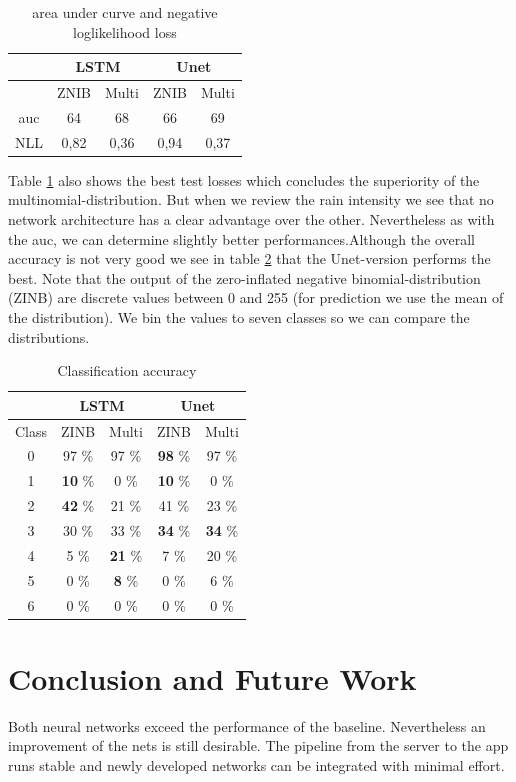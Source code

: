 \documentclass[oneside]{htwg-report}
\begin{document}
\begin{sloppypar}
\begin{table}[h]
\begin{tabular}[h]{|c|cc|cc|}
\hline
&\multicolumn{2}{c}{LSTM} &
\multicolumn{2}{c|}{Unet} \\
\hline
 & ZNIB & Multi & ZNIB & Multi \\
\hline
auc & 64 & 68 & 66 & 69 \\
NLL & 0,82 & 0,36 & 0,94 & 0,37\\
\hline
\end{tabular}

\caption{\centering area under curve and negative loglikelihood loss\label{tab:area}}
\end{table}

 Table \ref{tab:area} also shows the best test losses which concludes the superiority of the multinomial-distribution.
But when we review the rain intensity we see that no network architecture has a clear advantage over the other.
Nevertheless as with the auc, we can determine slightly better performances.Although the overall accuracy is not very good we see in table \ref{tab:raintable_classes} that the Unet-version performs the best.
Note that the output of the zero-inflated negative binomial-distribution (ZINB) are discrete values between 0 and 255 (for prediction we use the mean of the distribution). We bin the values to seven classes so we can compare the distributions.

\begin{table}[h]
\centering
\begin{tabular}[h]{|c|cc|cc|}
\hline
&\multicolumn{2}{c}{LSTM} &
\multicolumn{2}{c|}{Unet} \\
\hline
Class & ZINB & Multi & ZINB & Multi \\
\hline
0 & 97 \% & 97 \% & \textbf{98} \% & 97 \% \\
\hline
1 & \textbf{10} \% & 0 \% & \textbf{10} \% & 0 \% \\
\hline
2 & \textbf{42} \% & 21 \% & 41 \% & 23 \% \\
\hline
3 & 30 \% & 33 \% & \textbf{34} \% & \textbf{34} \% \\
\hline
4 & 5 \% & \textbf{21} \% & 7 \% & 20 \% \\
\hline
5 & 0 \% & \textbf{8} \% & 0 \% & 6 \% \\
\hline
6 & 0 \% & 0 \% & 0 \% & 0 \% \\
\hline
\end{tabular}
\caption{\centering Classification accuracy\label{tab:raintable_classes}}
\end{table}


\end{sloppypar}

\section*{Conclusion and Future Work}
\begin{sloppypar}
Both neural networks exceed the performance of the baseline. 
Nevertheless an improvement of the nets is still desirable. 
The pipeline from the server to the app runs stable and newly developed networks can be integrated with minimal effort. 
\end{sloppypar}
\printbibliography[title={References}, heading=subbibliography]
\end{document}
